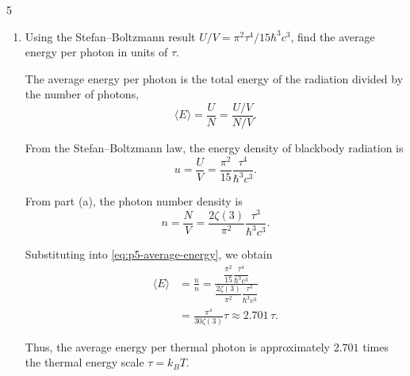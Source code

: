 \documentclass[11pt]{article}
\begin{document}
\begin{problem}{5}
\begin{enumerate}[label=(\alph*)]
  \item Using the Stefan--Boltzmann result \( U/V = \pi^2\tau^4/15\hbar^3c^3 \), find the average energy per photon in units of \( \tau \).
        \begin{answer}
 The average energy per photon is the total energy of the radiation
    divided by the number of photons,
    \begin{equation}
        \label{eq:p5-average-energy}
        \langle E \rangle = \frac{U}{N} = \frac{U/V}{N/V}.
    \end{equation}

    From the Stefan--Boltzmann law, the energy density of blackbody
    radiation is
    \begin{equation}
        \label{eq:p5-energy-density}
        u = \frac{U}{V}
        = \frac{\pi^2}{15}\frac{\tau^4}{\hbar^3 c^3}.
    \end{equation}

    From part (a), the photon number density is
    \begin{equation}
        \label{eq:p5-number-density}
        n = \frac{N}{V}
        = \frac{2\zeta(3)}{\pi^2}
        \frac{\tau^3}{\hbar^3 c^3}.
    \end{equation}

    Substituting into \cref{eq:p5-average-energy}, we obtain
    \begin{equation}
        \label{eq:p5-average-energy-result}
        \begin{aligned}
            \langle E \rangle
            &= \frac{u}{n} = \frac{
                \dfrac{\pi^2}{15}\dfrac{\tau^4}{\hbar^3 c^3}
            }{
                \dfrac{2\zeta(3)}{\pi^2}
                \dfrac{\tau^3}{\hbar^3 c^3}
            }\\
            &= \frac{\pi^4}{30\zeta(3)}\tau \approx \boxed{2.701\,\tau}.
        \end{aligned}
    \end{equation}

    Thus, the average energy per thermal photon is approximately
    \( 2.701 \) times the thermal energy scale \( \tau = k_B T \).
        \end{answer}
\end{enumerate}
\end{problem}
\end{document}
